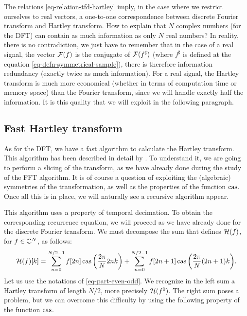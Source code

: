  
\begin{rem}
The relations \eqref{eq-relation-tfd-hartley} imply, in the case where we restrict ourselves to real vectors, a one-to-one correspondence between discrete Fourier transform and Hartley transform. How to explain that $ N $ complex numbers (for the DFT) can contain as much information as only $ N $ real numbers? In reality, there is no contradiction, we just have to remember that in the case of a real signal, the vector $ \mathcal{F}(f) $ is the conjugate of $ \mathcal{F}(f^\sharp) $ (where $ f^\sharp $ is defined at the equation \eqref{eq-defn-symmetrical-sample}), there is therefore information redundancy (exactly twice as much information). For a real signal, the Hartley transform is much more economical (whether in terms of computation time or memory space) than the Fourier transform, since we will handle exactly half the information. It is this quality that we will exploit in the following paragraph.
\end{rem}
 
\subsection{Fast Hartley transform}
\label{sect2-algo-de-calcul-hartley} 
 
 
  As for the DFT, we have a fast algorithm to calculate the Hartley transform. This algorithm has been described in detail by  \cite{ullmann}. To understand it, we are going to perform a slicing of the transform, as we have already done during the study of the FFT algorithm. It is of course a question of exploiting the (algebraic) symmetries of the transformation, as well as the properties of the function $ \operatorname{cas} $. Once all this is in place, we will naturally see a recursive algorithm appear.
 
 
This algorithm uses a property of temporal decimation. To obtain the corresponding recurrence equation, we will proceed as we have already done for the discrete Fourier transform. We must decompose the sum that defines $ \mathcal{H} (f) $, for $ f \in \mathbb{C}^N $, as follows:
\begin{equation}
\label{eq-decomposition-transfo-hartley1}
\mathcal{H} (f) [k] = \sum_{n = 0}^{N / 2-1}{f [2n] \operatorname{cas} \left(\frac{2 \pi}{N} 2 nk \right)} + \sum_{n = 0}^{N / 2-1}{f [2n + 1] \operatorname{cas} \left(\frac{2 \pi}{N} (2n + 1) k \right)}.
\end{equation}
Let us use the notations of \eqref{eq-part-even-odd}. We recognize in the left sum a Hartley transform of length $ N / 2 $, more precisely $ \mathcal{H} (f^{0}) $. The right sum poses a problem, but we can overcome this difficulty by using the following property of the function $ \operatorname{cas} $.
 

